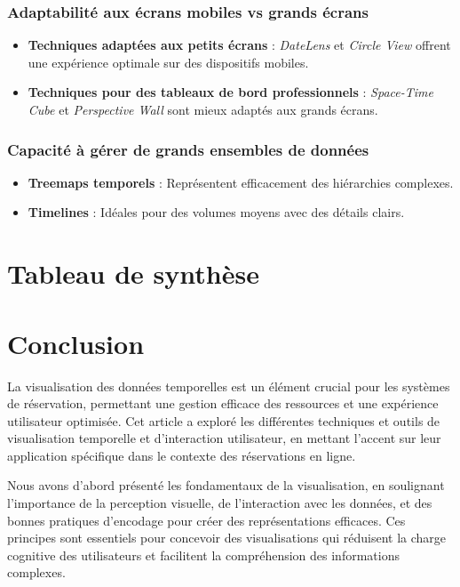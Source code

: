 \documentclass[runningheads]{llncs}
\begin{document}
\subsubsection{Adaptabilité aux écrans mobiles vs grands écrans}
\begin{itemize}
    \item \textbf{Techniques adaptées aux petits écrans} : \emph{DateLens} et \emph{Circle View} offrent une expérience optimale sur des dispositifs mobiles.
    \item \textbf{Techniques pour des tableaux de bord professionnels} : \emph{Space-Time Cube} et \emph{Perspective Wall} sont mieux adaptés aux grands écrans.
\end{itemize}

\subsubsection{Capacité à gérer de grands ensembles de données}
\begin{itemize}
    \item \textbf{Treemaps temporels} : Représentent efficacement des hiérarchies complexes.
    \item \textbf{Timelines} : Idéales pour des volumes moyens avec des détails clairs.
\end{itemize}

\section{Tableau de synthèse}

\section{Conclusion}

La visualisation des données temporelles est un élément crucial pour les systèmes de réservation, permettant une gestion efficace des ressources et une expérience utilisateur optimisée. Cet article a exploré les différentes techniques et outils de visualisation temporelle et d'interaction utilisateur, en mettant l'accent sur leur application spécifique dans le contexte des réservations en ligne.

Nous avons d'abord présenté les fondamentaux de la visualisation, en soulignant l'importance de la perception visuelle, de l'interaction avec les données, et des bonnes pratiques d'encodage pour créer des représentations efficaces. Ces principes sont essentiels pour concevoir des visualisations qui réduisent la charge cognitive des utilisateurs et facilitent la compréhension des informations complexes.
\end{document}
